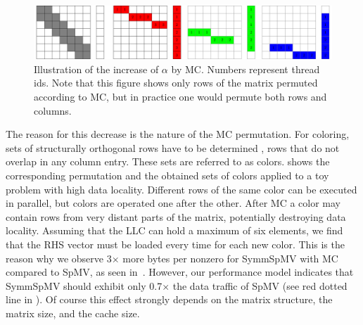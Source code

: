   \begin{figure}[t]
  	\centering
  	\includegraphics[scale=0.45]{pics/mc_alpha_problem/mc_alpha_unsymm}
  	\caption{Illustration of the increase of $\alpha$ by \acrshort{MC}. Numbers represent thread ids. Note that this figure shows only rows of the matrix permuted according to \acrshort{MC}, but in practice one would permute both rows and columns.}
  	\label{fig:mc_alpha}
  \end{figure}
  
The reason for this decrease is the nature of the \acrshort{MC}
permutation. For \DTWO coloring, sets of structurally orthogonal
rows have to be determined \cite{dist_k_def}, \ie rows that do not
overlap in any column entry. These sets are referred to as colors.  shows the corresponding permutation
and the obtained sets of colors applied to a toy problem with high
data locality. Different rows of the same color can be executed in
parallel, but colors are operated one after the
other. After \acrshort{MC} a color may contain rows from very distant
parts of the matrix, potentially destroying data locality.  Assuming
that the \acrshort{LLC} can hold a maximum of six elements, we find
that the RHS vector must be loaded every time for each
new color. This is the reason why we observe 3$\times$ more bytes
per nonzero for \acrshort{SymmSpMV} with \acrshort{MC} compared
to \acrshort{SpMV}, as seen in~.  However,
our performance model indicates that \acrshort{SymmSpMV} should
exhibit only 0.7$\times$ the data traffic of \acrshort{SpMV} (see
red dotted line in ). Of course this
effect strongly depends on the matrix structure, the matrix size, and
the cache size.
        
